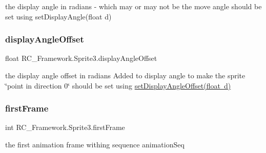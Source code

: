 the display angle in radians -\/ which may or may not be the move angle should be set using set\+Display\+Angle(float d) 

\mbox{\label{class_r_c___framework_1_1_sprite3_aafcde3bd32143744faf410c304a07f2d}} 
\subsubsection{\texorpdfstring{display\+Angle\+Offset}{displayAngleOffset}}
{\footnotesize\ttfamily float R\+C\+\_\+\+Framework.\+Sprite3.\+display\+Angle\+Offset}



the display angle offset in radians Added to display angle to make the sprite \char`\"{}point in direction 0\char`\"{} should be set using \mbox{\hyperlink{class_r_c___framework_1_1_sprite3_a2ec8cfce2feb2f1e648131e03099b147}{set\+Display\+Angle\+Offset(float d)}} 

\mbox{\label{class_r_c___framework_1_1_sprite3_a2ea65f55b021e3ce841161c43f4f7f9b}} 
\subsubsection{\texorpdfstring{first\+Frame}{firstFrame}}
{\footnotesize\ttfamily int R\+C\+\_\+\+Framework.\+Sprite3.\+first\+Frame\hspace{0.3cm}{\ttfamily [protected]}}



the first animation frame withing sequence \textquotesingle{}animation\+Seq\textquotesingle{} 

\mbox{\label{class_r_c___framework_1_1_sprite3_a2320b0a1f529f8b9998377a5690c2878}} 
